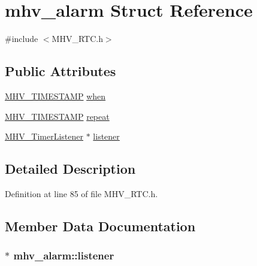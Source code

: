 \hypertarget{structmhv__alarm}{\section{mhv\-\_\-alarm Struct Reference}
\label{structmhv__alarm}
}


{\ttfamily \#include $<$M\-H\-V\-\_\-\-R\-T\-C.\-h$>$}

\subsection*{Public Attributes}
\begin{DoxyCompactItemize}
\item 
\hyperlink{_m_h_v___r_t_c_8h_a1e30d3a92b1b868286bd0d619245d8a6}{M\-H\-V\-\_\-\-T\-I\-M\-E\-S\-T\-A\-M\-P} \hyperlink{structmhv__alarm_acbab8b3b4efa4d891d598cbd5b47fb7c}{when}
\item 
\hyperlink{_m_h_v___r_t_c_8h_a1e30d3a92b1b868286bd0d619245d8a6}{M\-H\-V\-\_\-\-T\-I\-M\-E\-S\-T\-A\-M\-P} \hyperlink{structmhv__alarm_ad8195c11cd5d6ff3bb37d01185c04af2}{repeat}
\item 
\hyperlink{class_m_h_v___timer_listener}{M\-H\-V\-\_\-\-Timer\-Listener} $\ast$ \hyperlink{structmhv__alarm_a8293d729772996c869be76184bfc09e8}{listener}
\end{DoxyCompactItemize}


\subsection{Detailed Description}


Definition at line 85 of file M\-H\-V\-\_\-\-R\-T\-C.\-h.



\subsection{Member Data Documentation}
\hypertarget{structmhv__alarm_a8293d729772996c869be76184bfc09e8}{
\subsubsection[{listener}]{$\ast$ mhv\-\_\-alarm\-::listener}}\label{structmhv__alarm_a8293d729772996c869be76184bfc09e8}


